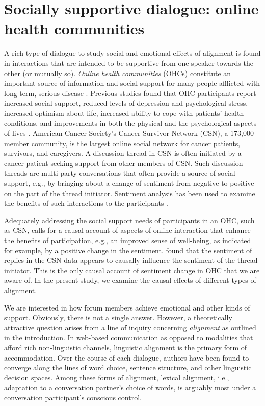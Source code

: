 \documentclass[man,biblatex,floatsintext]{apa6}
\begin{document}
\section{Socially supportive dialogue: online health communities}

A rich type of dialogue to study social and emotional effects of alignment is found in interactions that are intended to be supportive from one speaker towards the other (or mutually so).
\emph{Online health communities} (OHCs) constitute an important source of information and social support for many people afflicted with long-term, serious disease \parencite{dunkel1984social}. Previous studies found that OHC participants report increased social support, reduced levels of depression and psychological stress, increased optimism about life\parencite{rodgers2005internet}, increased ability to cope with patients' health conditions, and improvements in both the physical and the psychological aspects of lives \parencite{dunkel1984social,rodgers2005internet, maloney2005multilevel,beaudoin2008modeling,bouma2015internet}. American Cancer Society's Cancer Survivor Network (CSN), a 173,000-member community, is the largest online social network for cancer patients, survivors, and caregivers. A discussion thread in CSN is often initiated by a cancer patient seeking support from other members of CSN. Such discussion threads are multi-party conversations that often provide a source of social support, e.g., by bringing about a change of sentiment from negative to positive on the part of the thread initiator. Sentiment analysis has been used to examine the benefits of such interactions to the participants \parencite{qiu2011get,huh2013text,portier2013understanding}.

Adequately addressing the social support needs of participants in an OHC, such as CSN, calls for a causal account of aspects of online interaction that enhance the benefits of participation, e.g., an improved sense of well-being, as indicated for example, by a positive change in the sentiment. \citeauthor{bui2016temporal} found that the sentiment of replies in the CSN data appears to causally influence the sentiment of the thread initiator.  This is the only causal account of sentiment change in OHC that we are aware of.
In the present study, we examine the causal effects of different types of alignment.

We are interested in how forum members achieve emotional and other kinds of support.  Obviously, there is not a single answer.  However, a theoretically attractive question arises from a line of inquiry concerning \emph{alignment} as outlined in the introduction.  In web-based communication as opposed to modalities that afford rich non-linguistic channels,  linguistic alignment is the primary form of accommodation. Over the course of each dialogue, authors have been found to converge along the lines of word choice, sentence structure, and other linguistic decision spaces. Among these forms of alignment, lexical alignment, i.e., adaptation to a conversation partner's choice of words, is arguably most under a conversation participant's conscious control.
\end{document}
